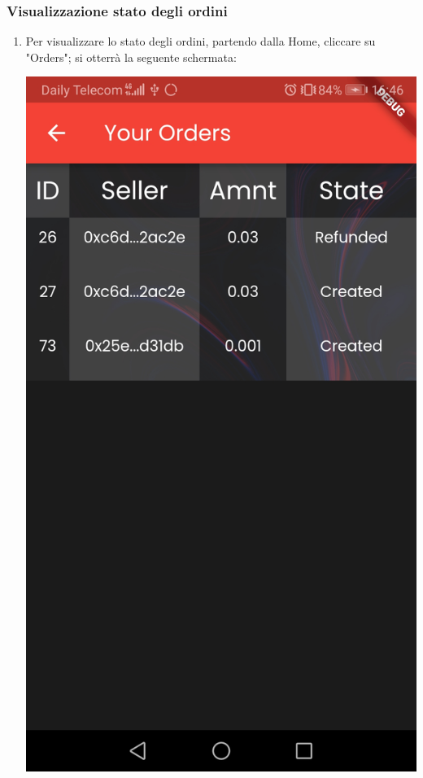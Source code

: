 \pagebreak

\subsubsection{Visualizzazione stato degli ordini}
\begin{enumerate}
    \item Per visualizzare lo stato degli ordini, partendo dalla Home, cliccare su "Orders"; si otterrà la seguente schermata: 
     \begin{center}
        \includegraphics[scale = 0.1]{img/ordiniMobile.jpg}
    \end{center}
\end{enumerate}
